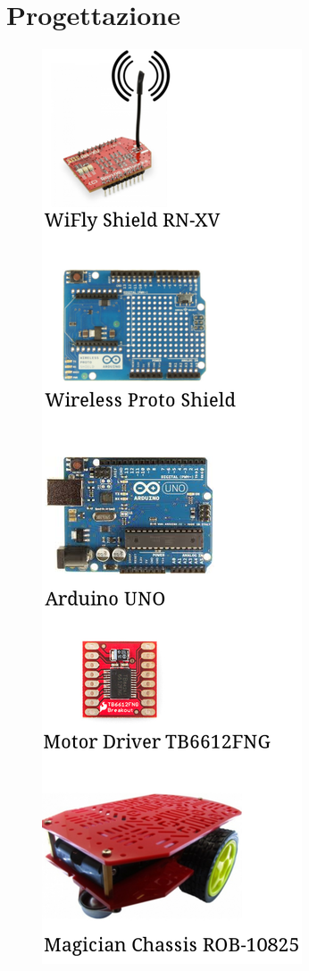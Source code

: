 \documentclass[a4paper,11pt]{report}
\begin{document}
\chapter{Progettazione}
\begin{figure}
    \includegraphics[scale=0.25]{sn.png}
\end{figure}
\end{document}
